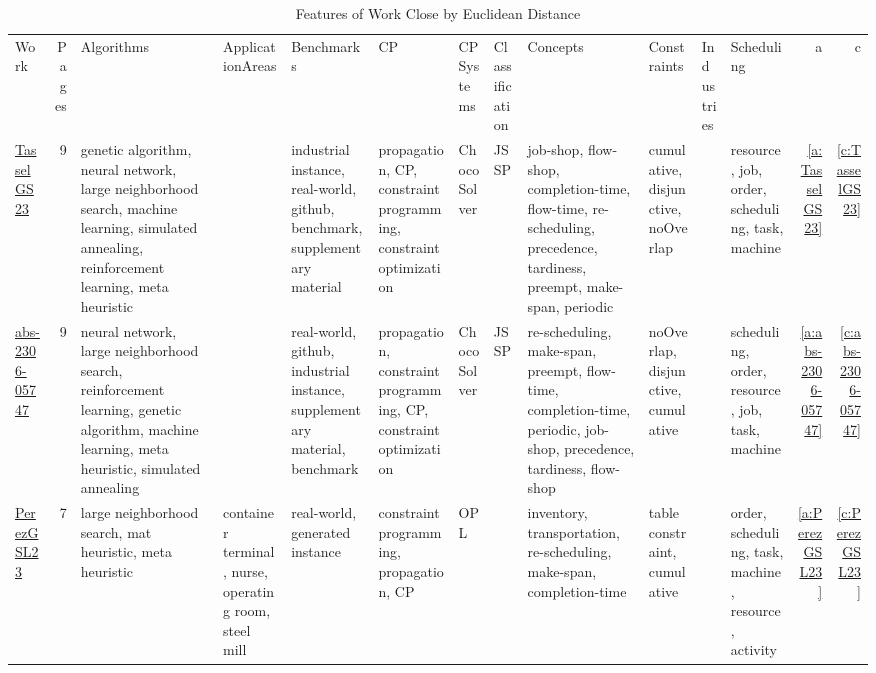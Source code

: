 {\scriptsize
\begin{longtable}{>{\raggedright\arraybackslash}p{3cm}r>{\raggedright\arraybackslash}p{1.5cm}>{\raggedright\arraybackslash}p{1.5cm}>{\raggedright\arraybackslash}p{1.5cm}>{\raggedright\arraybackslash}p{1.5cm}>{\raggedright\arraybackslash}p{1.5cm}>{\raggedright\arraybackslash}p{1.5cm}>{\raggedright\arraybackslash}p{1.5cm}>{\raggedright\arraybackslash}p{1.5cm}>{\raggedright\arraybackslash}p{1.5cm}>{\raggedright\arraybackslash}p{1.5cm}rr}
\rowcolor{white}\caption{Features of Work Close by Euclidean Distance}\\ \toprule
\rowcolor{white}Work & Pages & Algorithms& ApplicationAreas& Benchmarks& CP& CPSystems& Classification& Concepts& Constraints& Industries& Scheduling & a & c\\ \midrule\endhead
\bottomrule
\endfoot
\href{../works/TasselGS23.pdf}{TasselGS23}~\cite{TasselGS23} & 9 & genetic algorithm, neural network, large neighborhood search, machine learning, simulated annealing, reinforcement learning, meta heuristic &  & industrial instance, real-world, github, benchmark, supplementary material & propagation, CP, constraint programming, constraint optimization & Choco Solver & JSSP & job-shop, flow-shop, completion-time, flow-time, re-scheduling, precedence, tardiness, preempt, make-span, periodic & cumulative, disjunctive, noOverlap &  & resource, job, order, scheduling, task, machine & \ref{a:TasselGS23} & \ref{c:TasselGS23}\\
\href{../works/abs-2306-05747.pdf}{abs-2306-05747}~\cite{abs-2306-05747} & 9 & neural network, large neighborhood search, reinforcement learning, genetic algorithm, machine learning, meta heuristic, simulated annealing &  & real-world, github, industrial instance, supplementary material, benchmark & propagation, constraint programming, CP, constraint optimization & Choco Solver & JSSP & re-scheduling, make-span, preempt, flow-time, completion-time, periodic, job-shop, precedence, tardiness, flow-shop & noOverlap, disjunctive, cumulative &  & scheduling, order, resource, job, task, machine & \ref{a:abs-2306-05747} & \ref{c:abs-2306-05747}\\
\href{../works/PerezGSL23.pdf}{PerezGSL23}~\cite{PerezGSL23} & 7 & large neighborhood search, mat heuristic, meta heuristic & container terminal, nurse, operating room, steel mill & real-world, generated instance & constraint programming, propagation, CP & OPL &  & inventory, transportation, re-scheduling, make-span, completion-time & table constraint, cumulative &  & order, scheduling, task, machine, resource, activity & \ref{a:PerezGSL23} & \ref{c:PerezGSL23}\\

\end{longtable}}
